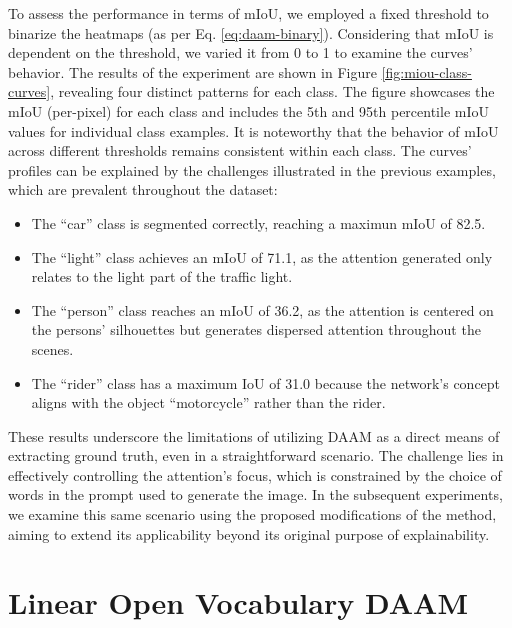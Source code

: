 To assess the performance in terms of mIoU, we employed a fixed threshold to binarize the heatmaps (as per Eq. \ref{eq:daam-binary}). Considering that mIoU is dependent on the threshold, we varied it from 0 to 1 to examine the curves' behavior. The results of the experiment are shown in Figure \ref{fig:miou-class-curves}, revealing four distinct patterns for each class. The figure showcases the mIoU (per-pixel) for each class and includes the 5th and 95th percentile mIoU values for individual class examples. It is noteworthy that the behavior of mIoU across different thresholds remains consistent within each class. The curves' profiles can be explained by the challenges illustrated in the previous examples, which are prevalent throughout the dataset:

\begin{itemize}
\item The ``car'' class is segmented correctly, reaching a maximun mIoU of 82.5.
\item The ``light'' class achieves an mIoU of 71.1, as the attention generated only relates to the light part of the traffic light.
\item The ``person'' class reaches an mIoU of 36.2, as the attention is centered on the persons' silhouettes but generates dispersed attention throughout the scenes.
\item The ``rider'' class has a maximum IoU of 31.0 because the network's concept aligns with the object ``motorcycle'' rather than the rider.
\end{itemize}

These results underscore the limitations of utilizing DAAM as a direct means of extracting ground truth, even in a straightforward scenario. The challenge lies in effectively controlling the attention's focus, which is constrained by the choice of words in the prompt used to generate the image. In the subsequent experiments, we examine this same scenario using the proposed modifications of the method, aiming to extend its applicability beyond its original purpose of explainability.


\section{Linear Open Vocabulary DAAM}
\label{sec:experiment-daam-ov}


